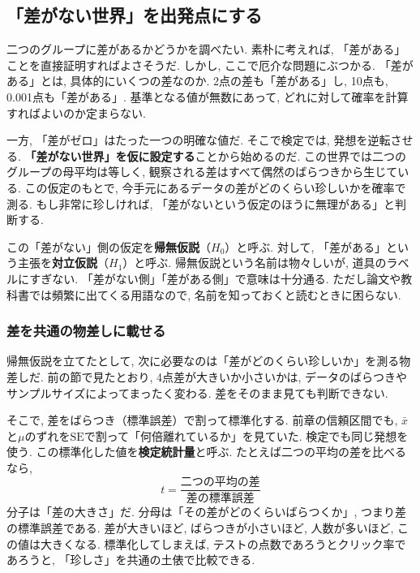   \subsection{「差がない世界」を出発点にする}

    二つのグループに差があるかどうかを調べたい.
    素朴に考えれば, 「差がある」ことを直接証明すればよさそうだ.
    しかし, ここで厄介な問題にぶつかる.
    「差がある」とは, 具体的にいくつの差なのか.
    2点の差も「差がある」し, 10点も, 0.001点も「差がある」.
    基準となる値が無数にあって, どれに対して確率を計算すればよいのか定まらない.

    一方, 「差がゼロ」はたった一つの明確な値だ.
    そこで検定では, 発想を逆転させる.
    \textbf{「差がない世界」を仮に設定する}ことから始めるのだ.
    この世界では二つのグループの母平均は等しく, 観察される差はすべて偶然のばらつきから生じている.
    この仮定のもとで, 今手元にあるデータの差がどのくらい珍しいかを確率で測る.
    もし非常に珍しければ, 「差がないという仮定のほうに無理がある」と判断する.

    この「差がない」側の仮定を\textbf{帰無仮説}（$H_0$）と呼ぶ.
    対して, 「差がある」という主張を\textbf{対立仮説}（$H_1$）と呼ぶ.
    帰無仮説という名前は物々しいが, 道具のラベルにすぎない.
    「差がない側」「差がある側」で意味は十分通る.
    ただし論文や教科書では頻繁に出てくる用語なので, 名前を知っておくと読むときに困らない.

    \subsubsection*{差を共通の物差しに載せる}

    帰無仮説を立てたとして, 次に必要なのは「差がどのくらい珍しいか」を測る物差しだ.
    前の節で見たとおり, 4点差が大きいか小さいかは, データのばらつきやサンプルサイズによってまったく変わる.
    差をそのまま見ても判断できない.

    そこで, 差をばらつき（標準誤差）で割って標準化する.
    前章の信頼区間でも, $\bar{x}$と$\mu$のずれを$\mathrm{SE}$で割って「何倍離れているか」を見ていた.
    検定でも同じ発想を使う.
    この標準化した値を\textbf{検定統計量}と呼ぶ.
    たとえば二つの平均の差を比べるなら,
    \[
      t = \frac{\text{二つの平均の差}}{\text{差の標準誤差}}
    \]
    分子は「差の大きさ」だ.
    分母は「その差がどのくらいばらつくか」, つまり差の標準誤差である.
    差が大きいほど, ばらつきが小さいほど, 人数が多いほど, この値は大きくなる.
    標準化してしまえば, テストの点数であろうとクリック率であろうと, 「珍しさ」を共通の土俵で比較できる.

